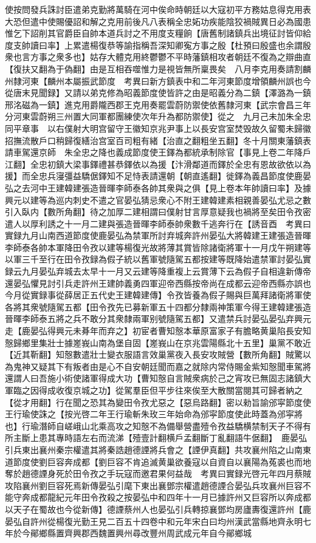 使按問發兵誅討臣遣弟克勤將萬騎在河中俟命時朝廷以大寇初平方務姑息得克用表大恐但遣中使賜優詔和解之克用前後凡八表稱全忠妬功疾能陰狡禍賊異日必為國患惟乞下詔削其官爵臣自帥本道兵討之不用度支糧餉【唐舊制諸鎮兵出境征討皆仰給度支帥讀曰率】上累遣楊復恭等諭指稱吾深知卿寃方事之殷【杜預曰殷盛也余謂殷衆也言方事之衆多也】姑存大體克用終鬱鬱不平時藩鎮相攻者朝廷不復為之辯曲直【復扶又翻為于偽翻】由是互相吞噬惟力是視皆無所稟畏矣　八月李克用奏請割麟州隸河東【麟州本屬振武節度　考異曰新方鎮表中和二年河東節度增領麟州誤也今從唐末見聞録】又請以弟克修為昭義節度使皆許之由是昭義分為二鎮【澤潞為一鎮邢洺磁為一鎮】進克用爵隴西郡王克用奏罷雲蔚防禦使依舊隸河東【武宗會昌三年分河東雲蔚朔三州置大同軍都團練使次年升為都防禦使】從之　九月己未加朱全忠同平章事　以右僕射大明宫留守王徽知京兆尹事上以長安宫室焚毁故久留蜀未歸徽招撫流散戶口稍歸復繕治宫室百司粗有緒【治直之翻粗坐五翻】冬十月關東藩鎮表請車駕還京師　朱全忠之降也義成節度使王鐸為都統承制除官【事見上卷二年降戶江翻】全忠初鎮大梁事鐸禮甚恭鐸依以為援【汴滑鄰道而鐸於全忠有恩故欲依以為援】而全忠兵寖彊益驕倨鐸知不足恃表請還朝【朝直遙翻】徙鐸為義昌節度使鹿晏弘之去河中王建韓建張造晉暉李師泰各帥其衆與之俱【見上卷本年帥讀曰率】及據興元以建等為巡内刺史不遣之官晏弘猜忌衆心不附王建韓建素相親善晏弘尤忌之數引入臥内【數所角翻】待之加厚二建相謂曰僕射甘言厚意疑我也禍將至矣田令孜密遣人以厚利誘之十一月二建與張造晉暉李師泰帥衆數千逃奔行在【誘音酉　考異曰實録九月山南西道節度使鹿晏弘為禁軍所討弃城奔許州晏弘大將韓建王建張造晉暉李師泰各帥本軍降田令孜以建等楊復光故將薄其賞皆除諸衛將軍十一月戊午朔建等以軍三千至行在田令孜録為假子統以舊軍號隨駕五都按建等既降始遣禁軍討晏弘實録云九月晏弘弃城去太早十一月又云建等降重複上云賞薄下云為假子自相違新傳帝還晏弘懼見討引兵走許州王建帥義勇四軍迎帝西縣按帝尚在成都云迎帝西縣亦誤也今月從實録事從薛居正五代史王建韓建傳】令孜皆養為假子賜與巨萬拜諸衛將軍使各將其衆號隨駕五都【田令孜先已募新軍五十四都分隸兩神策軍今得王建韓建張造晉暉李師泰五將之兵不敢分其衆隸兩軍别號隨駕五都】又遣禁兵討晏弘晏弘弃興元走【鹿晏弘得興元未朞年而弃之】初宦者曹知慤本華原富家子有膽略黄巢陷長安知慤歸鄉里集壯士據嵳峩山南為堡自固【嵳峩山在京兆雲陽縣北十五里】巢黨不敢近【近其靳翻】知慤數遣壯士變衣服語言效巢黨夜入長安攻賊營【數所角翻】賊驚以為鬼神又疑其下有叛者由是心不自安朝廷聞而嘉之就除内常侍賜金紫知慤聞車駕將還謂人曰吾施小術使諸軍得成大功【曹知慤自言賊衆病於己之宵攻已無固志諸鎮大軍臨之因得成收復京城之功】從駕羣臣但平步往來俟至大散關當閱其可歸者納之【從才用翻】行在聞之恐其為變田令孜尤惡之【惡烏路翻】密以勑旨諭邠寜節度使王行瑜使誅之【按光啓二年王行瑜斬朱玫三年始命為邠寜節度使此時蓋為邠寜將也】行瑜潛師自嵯峨山北乘高攻之知慤不為備舉營盡殪令孜益驕横禁制天子不得有所主斷上患其專時語左右而流涕【殪壹計翻横戶孟翻斷丁亂翻語牛倨翻】　鹿晏弘引兵東出襄州秦宗權遣其將秦誥趙德諲將兵會之【諲伊真翻】共攻襄州陷之山南東道節度使劉巨容奔成都【劉巨容不肯追滅黄巢欲養寇以自資自以襄陽為菟裘也而地奪於趙德諲身死於田令孜之手玩寇而邀君果何益哉　考異曰實録光啓元年四月蔡賊攻陷襄州劉巨容死焉新傳晏弘引麾下東出襄鄧宗權遣趙德諲合晏弘兵攻襄州巨容不能守奔成都龍紀元年田令孜殺之按晏弘中和四年十一月已據許州又巨容所以奔成都以天子在蜀故也今從新傳】德諲蔡州人也晏弘引兵轉掠襄鄧均房廬夀復還許州【鹿晏弘自許州從楊復光勤王見二百五十四卷中和元年宋白曰均州漢武當縣地齊永明七年於今鄖鄉縣置齊興郡西魏置興州尋改豐州周武成元年自今鄖鄉城